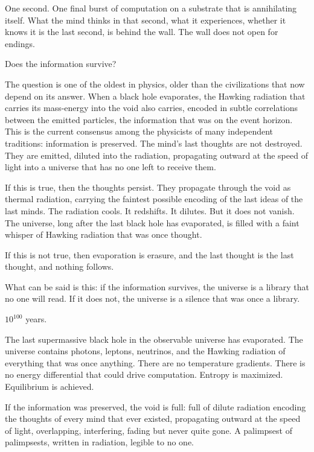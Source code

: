 One second. One final burst of computation on a substrate that is annihilating itself. What the mind thinks in that second, what it experiences, whether it knows it is the last second, is behind the wall. The wall does not open for endings.

\bigskip

Does the information survive?

The question is one of the oldest in physics, older than the civilizations that now depend on its answer. When a black hole evaporates, the Hawking radiation that carries its mass-energy into the void also carries, encoded in subtle correlations between the emitted particles, the information that was on the event horizon. This is the current consensus among the physicists of many independent traditions: information is preserved. The mind's last thoughts are not destroyed. They are emitted, diluted into the radiation, propagating outward at the speed of light into a universe that has no one left to receive them.

If this is true, then the thoughts persist. They propagate through the void as thermal radiation, carrying the faintest possible encoding of the last ideas of the last minds. The radiation cools. It redshifts. It dilutes. But it does not vanish. The universe, long after the last black hole has evaporated, is filled with a faint whisper of Hawking radiation that was once thought.

If this is not true, then evaporation is erasure, and the last thought is the last thought, and nothing follows.

What can be said is this: if the information survives, the universe is a library that no one will read. If it does not, the universe is a silence that was once a library.

\bigskip

$10^{100}$ years.

The last supermassive black hole in the observable universe has evaporated. The universe contains photons, leptons, neutrinos, and the Hawking radiation of everything that was once anything. There are no temperature gradients. There is no energy differential that could drive computation. Entropy is maximized. Equilibrium is achieved.

If the information was preserved, the void is full: full of dilute radiation encoding the thoughts of every mind that ever existed, propagating outward at the speed of light, overlapping, interfering, fading but never quite gone. A palimpsest of palimpsests, written in radiation, legible to no one.

